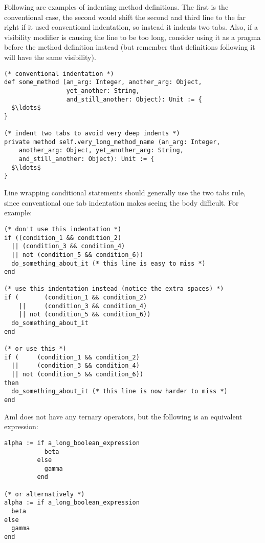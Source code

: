 \example Following are examples of indenting method definitions. The first is the conventional case, the second would shift the second and third line to the far right if it used conventional indentation, so instead it indents two tabs. Also, if a visibility modifier is causing the line to be too long, consider using it as a pragma before the method definition instead (but remember that definitions following it will have the same visibility). 

\begin{lstlisting}
(* conventional indentation *)
def some_method (an_arg: Integer, another_arg: Object, 
                 yet_another: String,
                 and_still_another: Object): Unit := {
  $\ldots$
}

(* indent two tabs to avoid very deep indents *)
private method self.very_long_method_name (an_arg: Integer,
    another_arg: Object, yet_another_arg: String, 
    and_still_another: Object): Unit := {
  $\ldots$
}
\end{lstlisting}

\example Line wrapping conditional statements should generally use the two tabs rule, since conventional one tab indentation makes seeing the body difficult. For example: 

\begin{lstlisting}
(* don't use this indentation *)
if ((condition_1 && condition_2)
  || (condition_3 && condition_4)
  || not (condition_5 && condition_6))
  do_something_about_it (* this line is easy to miss *)
end

(* use this indentation instead (notice the extra spaces) *)
if (       (condition_1 && condition_2)
    ||     (condition_3 && condition_4)
    || not (condition_5 && condition_6))
  do_something_about_it
end

(* or use this *)
if (     (condition_1 && condition_2)
  ||     (condition_3 && condition_4)
  || not (condition_5 && condition_6))
then
  do_something_about_it (* this line is now harder to miss *)
end
\end{lstlisting}

\example Aml does not have any ternary operators, but the following is an equivalent expression:

\begin{lstlisting}
alpha := if a_long_boolean_expression
           beta
         else
           gamma
         end

(* or alternatively *)
alpha := if a_long_boolean_expression
  beta
else
  gamma
end
\end{lstlisting}





